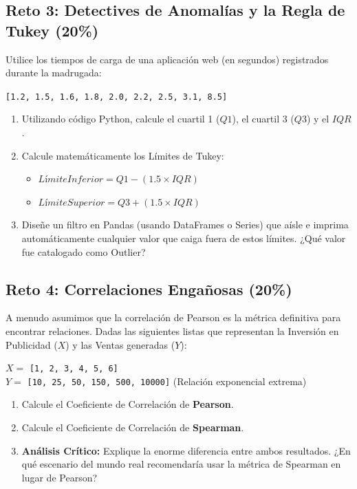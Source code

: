 \documentclass[12pt,a4paper]{article}
\begin{document}
\subsection*{Reto 3: Detectives de Anomalías y la Regla de Tukey (20\%)}
Utilice los tiempos de carga de una aplicación web (en segundos) registrados durante la madrugada:
\begin{center}
    \texttt{[1.2, 1.5, 1.6, 1.8, 2.0, 2.2, 2.5, 3.1, 8.5]}
\end{center}
\begin{enumerate}
    \item Utilizando código Python, calcule el cuartil 1 ($Q1$), el cuartil 3 ($Q3$) y el $IQR$.
    \item Calcule matemáticamente los Límites de Tukey: 
    \begin{itemize}
        \item $Límite Inferior = Q1 - (1.5 \times IQR)$
        \item $Límite Superior = Q3 + (1.5 \times IQR)$
    \end{itemize}
    \item Diseñe un filtro en Pandas (usando DataFrames o Series) que aísle e imprima automáticamente cualquier valor que caiga fuera de estos límites. ¿Qué valor fue catalogado como Outlier?
\end{enumerate}

\subsection*{Reto 4: Correlaciones Engañosas (20\%)}
A menudo asumimos que la correlación de Pearson es la métrica definitiva para encontrar relaciones. Dadas las siguientes listas que representan la Inversión en Publicidad ($X$) y las Ventas generadas ($Y$):
\begin{center}
    $X =$ \texttt{[1, 2, 3, 4, 5, 6]} \\
    $Y =$ \texttt{[10, 25, 50, 150, 500, 10000]} (Relación exponencial extrema)
\end{center}
\begin{enumerate}
    \item Calcule el Coeficiente de Correlación de \textbf{Pearson}.
    \item Calcule el Coeficiente de Correlación de \textbf{Spearman}.
    \item \textbf{Análisis Crítico:} Explique la enorme diferencia entre ambos resultados. ¿En qué escenario del mundo real recomendaría usar la métrica de Spearman en lugar de Pearson?
\end{enumerate}
\end{document}
